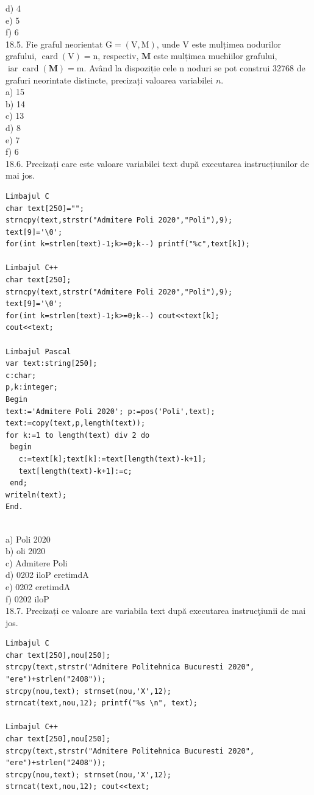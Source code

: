 {{d) 4
\\
e) 5
\\
f) 6
\\
18.5. Fie graful neorientat $\mathrm{G}=(\mathrm{V}, \mathrm{M})$, unde V este mulțimea nodurilor grafului, $\operatorname{card}(\mathrm{V})=\mathrm{n}$, respectiv, $\mathbf{M}$ este mulțimea muchiilor grafului, $\operatorname{iar} \operatorname{card}(\mathbf{M})=\mathrm{m}$. Având la dispoziție cele n noduri se pot construi 32768 de grafuri neorintate distincte, precizați valoarea variabilei $n$.
\\
a) 15
\\
b) 14
\\
c) 13
\\
d) 8
\\
e) 7
\\
f) 6
\\
18.6. Precizați care este valoare variabilei text după executarea instrucțiunilor de mai jos.
\begin{verbatim}
Limbajul C 
char text[250]=""; 
strncpy(text,strstr("Admitere Poli 2020","Poli"),9); 
text[9]='\0'; 
for(int k=strlen(text)-1;k>=0;k--) printf("%c",text[k]); 
 
Limbajul C++ 
char text[250]; 
strncpy(text,strstr("Admitere Poli 2020","Poli"),9); 
text[9]='\0'; 
for(int k=strlen(text)-1;k>=0;k--) cout<<text[k]; 
cout<<text; 
 
Limbajul Pascal  
var text:string[250]; 
c:char; 
p,k:integer; 
Begin 
text:='Admitere Poli 2020'; p:=pos('Poli',text);
text:=copy(text,p,length(text)); 
for k:=1 to length(text) div 2 do 
 begin 
   c:=text[k];text[k]:=text[length(text)-k+1]; 
   text[length(text)-k+1]:=c; 
 end; 
writeln(text); 
End.
\end{verbatim}
\\
a) Poli 2020
\\
b) oli 2020
\\
c) Admitere Poli
\\
d) 0202 iloP eretimdA
\\
e) 0202 eretimdA
\\
f) 0202 iloP
\\
18.7. Precizați ce valoare are variabila text după executarea instrucţiunii de mai jos.
\begin{verbatim}
Limbajul C 
char text[250],nou[250]; 
strcpy(text,strstr("Admitere Politehnica Bucuresti 2020", 
"ere")+strlen("2408")); 
strcpy(nou,text); strnset(nou,'X',12); 
strncat(text,nou,12); printf("%s \n", text); 
 
Limbajul C++ 
char text[250],nou[250]; 
strcpy(text,strstr("Admitere Politehnica Bucuresti 2020", 
"ere")+strlen("2408")); 
strcpy(nou,text); strnset(nou,'X',12); 
strncat(text,nou,12); cout<<text; 
 

\end{verbatim}}}
